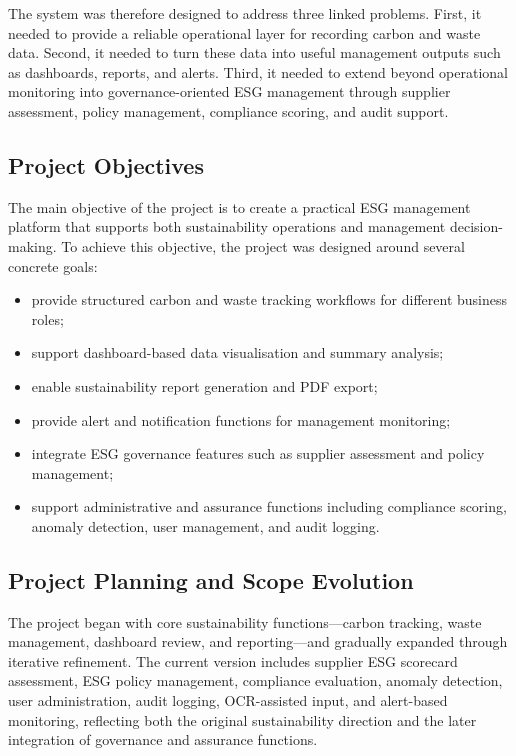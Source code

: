 \documentclass[11pt,a4paper]{article}
\begin{document}
The system was therefore designed to address three linked problems. First, it needed to provide a reliable operational layer for recording carbon and waste data. Second, it needed to turn these data into useful management outputs such as dashboards, reports, and alerts. Third, it needed to extend beyond operational monitoring into governance-oriented ESG management through supplier assessment, policy management, compliance scoring, and audit support.

\subsection{Project Objectives}
The main objective of the project is to create a practical ESG management platform that supports both sustainability operations and management decision-making. To achieve this objective, the project was designed around several concrete goals:

\begin{itemize}[leftmargin=1.4em,itemsep=2pt,topsep=2pt]
    \item provide structured carbon and waste tracking workflows for different business roles;
    \item support dashboard-based data visualisation and summary analysis;
    \item enable sustainability report generation and PDF export;
    \item provide alert and notification functions for management monitoring;
    \item integrate ESG governance features such as supplier assessment and policy management;
    \item support administrative and assurance functions including compliance scoring, anomaly detection, user management, and audit logging.
\end{itemize}

\subsection{Project Planning and Scope Evolution}
The project began with core sustainability functions---carbon tracking, waste management, dashboard review, and reporting---and gradually expanded through iterative refinement. The current version includes supplier ESG scorecard assessment, ESG policy management, compliance evaluation, anomaly detection, user administration, audit logging, OCR-assisted input, and alert-based monitoring, reflecting both the original sustainability direction and the later integration of governance and assurance functions.
\end{document}
